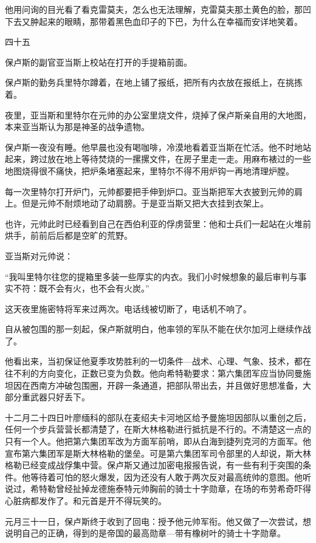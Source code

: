 他用问询的目光看了看克雷莫夫，怎么也无法理解，克雷莫夫那土黄色的脸，那凹下去又肿起来的眼睛，那带着黑色血印子的下巴，为什么在幸福而安详地笑着。

四十五

保卢斯的副官亚当斯上校站在打开的手提箱前面。

保卢斯的勤务兵里特尔蹲着，在地上铺了报纸，把所有内衣放在报纸上，在挑拣着。

夜里，亚当斯和里特尔在元帅的办公室里烧文件，烧掉了保卢斯亲自用的大地图，本来亚当斯认为那是神圣的战争遗物。

保卢斯一夜没有睡。他早晨也没有喝咖啡，冷漠地看着亚当斯在忙活。他不时地站起来，跨过放在地上等待焚烧的一摞摞文件，在房子里走一走。用麻布裱过的一些地图烧得很不痛快，把炉条堵塞起来，里特尔不得不用炉钩一再地清理炉膛。

每一次里特尔打开炉门，元帅都要把手伸到炉口。亚当斯把军大衣披到元帅的肩上。但是元帅不耐烦地动了动肩膀。于是亚当斯又把大衣挂到衣架上。

也许，元帅此时已经看到自己在西伯利亚的俘虏营里：他和士兵们一起站在火堆前烘手，前前后后都是空旷的荒野。

亚当斯对元帅说：

“我叫里特尔往您的提箱里多装一些厚实的内衣。我们小时候想象的最后审判与事实不符：既不会有火，也不会有火炭。”

这天夜里施密特将军来过两次。电话线被切断了，电话机不响了。

自从被包围的那一刻起，保卢斯就明白，他率领的军队不能在伏尔加河上继续作战了。

他看出来，当初保证他夏季攻势胜利的一切条件—战术、心理、气象、技术，都在往不利的方向变化，正数已变为负数。他向希特勒要求：第六集团军应当协同曼施坦因在西南方冲破包围圈，开辟一条通道，把部队带出去，并且做好思想准备，大部分重武器只好丢下。

十二月二十四日叶廖缅科的部队在麦绍夫卡河地区给予曼施坦因部队以重创之后，任何一个步兵营营长都清楚了，在斯大林格勒进行抵抗是不行的。不清楚这一点的只有一个人。他把第六集团军改为方面军前哨，即从白海到捷列克河的方面军。他宣布第六集团军是斯大林格勒的堡垒。可是第六集团军司令部里的人却说，斯大林格勒已经变成战俘集中营。保卢斯又通过加密电报报告说，有一些有利于突围的条件。他等待着可怕的怒火爆发，因为还没有人敢于两次反对最高统帅的意图。他听说过，希特勒曾经扯掉龙德施泰特元帅胸前的骑士十字勋章，在场的布劳希奇吓得心脏病都发作了。和元首是开不得玩笑的。

元月三十一日，保卢斯终于收到了回电：授予他元帅军衔。他又做了一次尝试，想说明自己的正确，得到的是帝国的最高勋章—带有橡树叶的骑士十字勋章。

